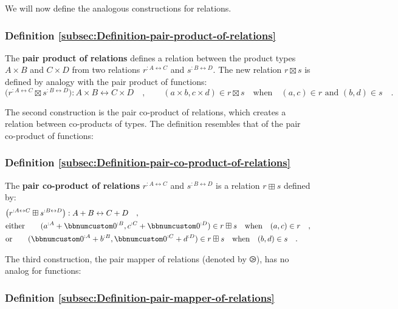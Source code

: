 We will now define the analogous constructions for relations.

\subsubsection{Definition \label{subsec:Definition-pair-product-of-relations}\ref{subsec:Definition-pair-product-of-relations}}

The \textbf{pair product of relations}
defines a relation between the product types $A\times B$ and $C\times D$
from two relations $r^{:A\leftrightarrow C}$ and $s^{:B\leftrightarrow D}$.
The new relation $r\boxtimes s$ is defined by analogy with the pair
product of functions:
\[
\big(r^{:A\leftrightarrow C}\boxtimes s^{:B\leftrightarrow D}\big):A\times B\leftrightarrow C\times D\quad,\quad\quad(a\times b,c\times d)\in r\boxtimes s\quad\text{when}\quad(a,c)\in r\text{ and }(b,d)\in s\quad.
\]

The second construction is the pair co-product of relations,
which creates a relation between co-products of types. The definition
resembles that of the pair co-product
of functions:

\subsubsection{Definition \label{subsec:Definition-pair-co-product-of-relations}\ref{subsec:Definition-pair-co-product-of-relations}}

The \textbf{pair co-product of relations} $r^{:A\leftrightarrow C}$
and $s^{:B\leftrightarrow D}$ is a relation $r\boxplus s$ defined
by:
\begin{align*}
 & \big(r^{:A\leftrightarrow C}\boxplus s^{:B\leftrightarrow D}\big):A+B\leftrightarrow C+D\quad,\\
 & \text{either}\quad\quad(a^{:A}+\bbnum 0^{:B},c^{:C}+\bbnum 0^{:D})\in r\boxplus s\quad\text{when}\quad(a,c)\in r\quad,\\
 & \text{or}\quad\quad(\bbnum 0^{:A}+b^{:B},\bbnum 0^{:C}+d^{:D})\in r\boxplus s\quad\text{when}\quad(b,d)\in s\quad.
\end{align*}

The third construction, the pair mapper of relations
(denoted by $\ogreaterthan$), has no analog for functions:

\subsubsection{Definition \label{subsec:Definition-pair-mapper-of-relations}\ref{subsec:Definition-pair-mapper-of-relations}}

